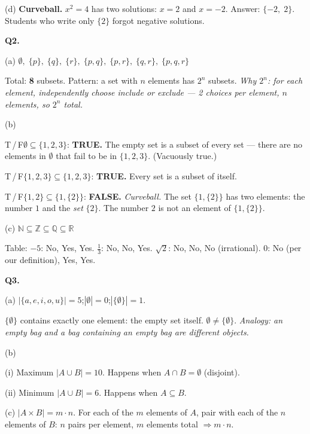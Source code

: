 \documentclass[12pt]{article}
\begin{document}
(d)\; \textbf{Curveball.} $x^2 = 4$ has two solutions: $x = 2$ and $x = -2$.
Answer: $\{-2,\; 2\}$.
Students who write only $\{2\}$ forgot negative solutions.

\bigskip
\textbf{Q2.}

(a)\; $\emptyset,\; \{p\},\; \{q\},\; \{r\},\; \{p,q\},\; \{p,r\},\; \{q,r\},\; \{p,q,r\}$

Total: \textbf{8} subsets. Pattern: a set with $n$ elements has $2^n$ subsets.
\textit{Why $2^n$: for each element, independently choose include or exclude ---
2 choices per element, $n$ elements, so $2^n$ total.}

(b)

T\,/\,F\quad $\emptyset \subseteq \{1,2,3\}$: \textbf{TRUE.}
The empty set is a subset of every set --- there are no elements in $\emptyset$
that fail to be in $\{1,2,3\}$.
(Vacuously true.)

T\,/\,F\quad $\{1,2,3\} \subseteq \{1,2,3\}$: \textbf{TRUE.}
Every set is a subset of itself.

T\,/\,F\quad $\{1,2\} \subseteq \{1,\{2\}\}$: \textbf{FALSE.}
\textit{Curveball.} The set $\{1,\{2\}\}$ has two elements: the number $1$ and the
\textit{set} $\{2\}$. The number $2$ is not an element of $\{1,\{2\}\}$.

(c)\; $\mathbb{N} \subseteq \mathbb{Z} \subseteq \mathbb{Q} \subseteq \mathbb{R}$

Table:
$-5$: No, Yes, Yes.\quad
$\tfrac{1}{3}$: No, No, Yes.\quad
$\sqrt{2}$: No, No, No (irrational).\quad
$0$: No (per our definition), Yes, Yes.

\bigskip
\textbf{Q3.}

(a)\; $|\{a,e,i,o,u\}| = 5$;\quad $|\emptyset| = 0$;\quad $|\{\emptyset\}| = 1$.

$\{\emptyset\}$ contains exactly one element: the empty set itself. $\emptyset \neq \{\emptyset\}$.
\textit{Analogy: an empty bag and a bag containing an empty bag are different objects.}

(b)

(i) Maximum $|A \cup B| = 10$. Happens when $A \cap B = \emptyset$ (disjoint).

(ii) Minimum $|A \cup B| = 6$. Happens when $A \subseteq B$.

(c)\; $|A \times B| = m \cdot n$.
For each of the $m$ elements of $A$, pair with each of the $n$ elements of $B$:
$n$ pairs per element, $m$ elements total $\Rightarrow m \cdot n$.

\end{document}
